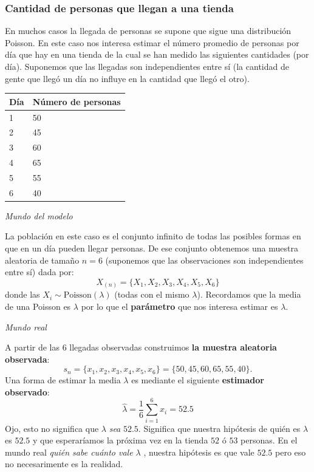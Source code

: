 \documentclass[
]{book}
\newenvironment{Ejemplo}
{\begin{mdframed}[
  linecolor=ejemplocolor,
  skipabove=12pt,
  skipbelow=12pt,
  roundcorner=20pt,
  splittopskip=2\topsep]}
{\end{mdframed}}
\begin{document}
\begin{Ejemplo}
\hypertarget{cantidad-de-personas-que-llegan-a-una-tienda}{%
\subsubsection{Cantidad de personas que llegan a una
tienda}\label{cantidad-de-personas-que-llegan-a-una-tienda}}

En muchos casos la llegada de personas se supone que sigue una
distribución Poisson. En este caso nos interesa estimar el número
promedio de personas por día que hay en una tienda de la cual se han
medido las siguientes cantidades (por día). Suponemos que las llegadas
son independientes entre sí (la cantidad de gente que llegó un día no
influye en la cantidad que llegó el otro).

\begin{longtable}[]{@{}ll@{}}
\toprule
\textbf{Día} & \textbf{Número de personas}\tabularnewline
\midrule
\endhead
1 & 50\tabularnewline
2 & 45\tabularnewline
3 & 60\tabularnewline
4 & 65\tabularnewline
5 & 55\tabularnewline
6 & 40\tabularnewline
\bottomrule
\end{longtable}

\emph{Mundo del modelo}

La población en este caso es el conjunto infinito de todas las posibles
formas en que en un día pueden llegar personas. De ese conjunto
obtenemos una muestra aleatoria de tamaño \(n = 6\) (suponemos que las
observaciones son independientes entre sí) dada por: \[
X_{(n)} = \{ X_1, X_2, X_3, X_4, X_5, X_6\}
\] donde las \(X_i \sim \text{Poisson}(\lambda)\) (todas con el mismo
\(\lambda\)). Recordamos que la media de una Poisson es \(\lambda\) por
lo que el \textbf{parámetro} que nos interesa estimar es \(\lambda\).

\emph{Mundo real}

A partir de las \(6\) llegadas observadas construimos \textbf{la muestra
aleatoria observada}: \[
s_n = \{x_1, x_2, x_3, x_4, x_5, x_6 \} = \{50, 45, 60, 65, 55, 40\}.
\] Una forma de estimar la media \(\lambda\) es mediante el siguiente
\textbf{estimador observado}: \[
\hat{\lambda} = \frac{1}{6} \sum_{i = 1}^6 x_i = 52.5
\] Ojo, esto no significa que \(\lambda\) \emph{sea} \(52.5\). Significa
que nuestra hipótesis de quién es \(\lambda\) es \(52.5\) y que
esperaríamos la próxima vez en la tienda \(52\) ó \(53\) personas. En el
mundo real \emph{quién sabe cuánto vale \(\lambda\)} , nuestra hipótesis
es que vale \(52.5\) pero eso no necesarimente es la realidad.
\end{Ejemplo}
\end{document}
